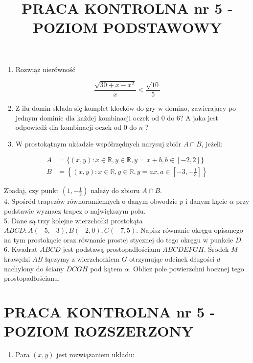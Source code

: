 \documentclass[10pt]{article}
\title{PRACA KONTROLNA nr 5 - POZIOM PODSTAWOWY }
\author{}
\date{}
\begin{document}
\maketitle
\begin{enumerate}
  \item Rozwiąż nierówność
\end{enumerate}

$$
\frac{\sqrt{30+x-x^{2}}}{x}<\frac{\sqrt{10}}{5}
$$

\begin{enumerate}
  \setcounter{enumi}{1}
  \item Z ilu domin składa się komplet klocków do gry w domino, zawierający po jednym dominie dla każdej kombinacji oczek od 0 do 6? A jaka jest odpowiedź dla kombinacji oczek od 0 do $n$ ?
  \item W prostokątnym układzie współrzędnych narysuj zbiór $A \cap B$, jeżeli:
\end{enumerate}

$$
\begin{aligned}
A & =\{(x, y): x \in \mathbb{R}, y \in \mathbb{R}, y=x+b, b \in[-2,2]\} \\
B & =\left\{(x, y): x \in \mathbb{R}, y \in \mathbb{R}, y=a x, a \in\left[-3,-\frac{1}{3}\right]\right\}
\end{aligned}
$$

Zbadaj, czy punkt $\left(1,-\frac{1}{2}\right)$ należy do zbioru $A \cap B$.\\
4. Spośród trapezów równoramiennych o danym obwodzie $p$ i danym kącie $\alpha$ przy podstawie wyznacz trapez o największym polu.\\
5. Dane są trzy kolejne wierzchołki prostokąta $A B C D: A(-5,-3), B(-2,0), C(-7,5)$. Napisz równanie okręgu opisanego na tym prostokącie oraz równanie prostej stycznej do tego okręgu w punkcie $D$.\\
6. Kwadrat $A B C D$ jest podstawą prostopadłościanu $A B C D E F G H$. Środek $M$ krawędzi $A B$ łączymy z wierzchołkiem $G$ otrzymując odcinek długości $d$ nachylony do ściany $D C G H$ pod kątem $\alpha$. Oblicz pole powierzchni bocznej tego prostopadłościanu.

\section*{PRACA KONTROLNA nr 5 - POZIOM ROZSZERZONY}
\begin{enumerate}
  \item Para $(x, y)$ jest rozwiązaniem układu:
\end{enumerate}
\end{document}
